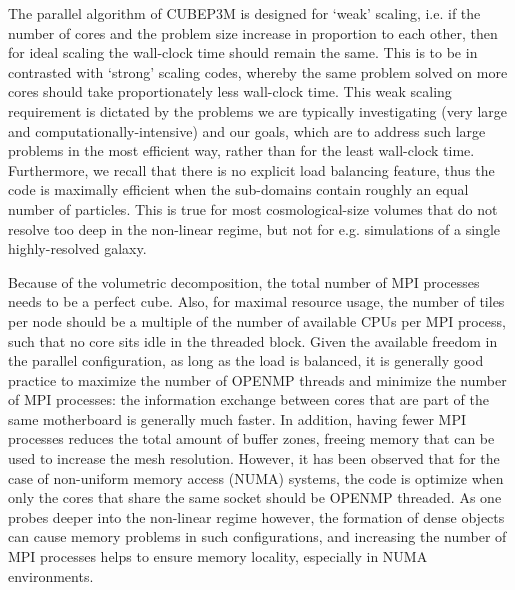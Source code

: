 \documentclass[useAMS,usenatbib]{mn2e}
\begin{document}
The parallel algorithm of {\small CUBEP3M} is designed for `weak' 
scaling, i.e. if the number of cores and the problem size 
increase in proportion to each other, then for ideal scaling the 
wall-clock time should remain the same. This is to be in contrasted with `strong' 
scaling codes, whereby the same problem solved on more cores should take 
proportionately less wall-clock time. This weak scaling requirement 
is dictated by the problems we are typically investigating (very 
large and computationally-intensive) and our goals, which are to 
address such large problems in the most efficient way, rather than 
for the least wall-clock time. Furthermore, we recall that there is no explicit 
load balancing feature, thus the code is maximally efficient when the sub-domains
contain roughly an equal number of particles. This is true for most
cosmological-size volumes that do not resolve too deep in the non-linear regime, 
but not for e.g. simulations of a single highly-resolved galaxy. 

Because of the volumetric decomposition, the total number of {\small MPI} processes needs
to be a perfect cube. Also, for maximal resource usage, the number of tiles per node 
should be a multiple of the number of available {\small CPU}s per {\small MPI} process,
such that no core sits idle in the threaded block.
Given the available freedom in the parallel configuration, as long as the load is balanced, 
it is generally good practice to maximize the number of {\small OPENMP} threads and minimize the number of {\small MPI} processes:
the information exchange between cores that are part of the same motherboard is generally much faster.
In addition, having fewer {\small MPI} processes reduces the total amount of buffer zones, 
freeing memory that can be used to increase the mesh resolution. 
However, it has been observed that for the case of non-uniform memory access (NUMA) systems, 
the code is optimize when only the cores that share the same socket should be  {\small OPENMP} threaded.
As one probes deeper into the non-linear regime however, 
the formation of dense objects can cause memory problems in such configurations, and increasing 
the number of {\small MPI} processes helps to ensure memory locality,
especially in NUMA environments.


\end{document}
